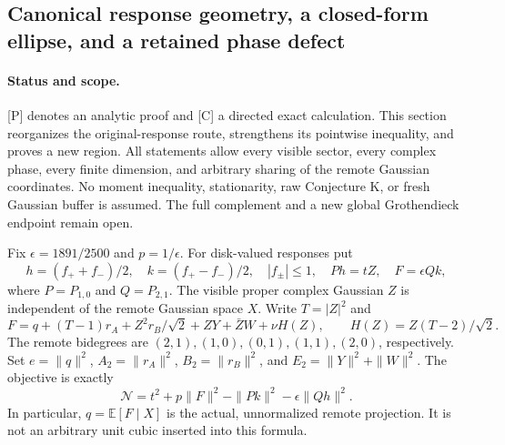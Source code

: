 \subsection{Canonical response geometry, a closed-form ellipse, and a retained phase defect}
\label{sec:canonical-response-ellipse}

\paragraph{Status and scope.}
[P] denotes an analytic proof and [C] a directed exact calculation.
This section reorganizes the original-response route, strengthens its
pointwise inequality, and proves a new region. All statements allow every
visible sector, every complex phase, every finite dimension, and arbitrary
sharing of the remote Gaussian coordinates. No moment inequality,
stationarity, raw Conjecture K, or fresh Gaussian buffer is assumed.
The full complement and a new global Grothendieck endpoint remain open.

Fix $\epsilon=1891/2500$ and $p=1/\epsilon$. For disk-valued responses put
\[
 h=(f_++f_-)/2,\quad k=(f_+-f_-)/2,\quad |f_\pm|\le1,
 \quad Ph=tZ,\quad F=\epsilon Qk,
\]
where $P=P_{1,0}$ and $Q=P_{2,1}$. The visible proper complex Gaussian
$Z$ is independent of the remote Gaussian space $X$. Write $T=|Z|^2$ and
\[
 F=q+(T-1)r_A+Z^2r_B/\sqrt2+ZY+\bar ZW+\nu H(Z),
 \qquad H(Z)=Z(T-2)/\sqrt2.
\]
The remote bidegrees are $(2,1),(1,0),(0,1),(1,1),(2,0)$, respectively.
Set $e=\|q\|^2$, $A_2=\|r_A\|^2$, $B_2=\|r_B\|^2$, and
$E_2=\|Y\|^2+\|W\|^2$. The objective is exactly
\[
 \mathcal N=t^2+p\|F\|^2-\|Pk\|^2-\epsilon\|Qh\|^2.
\]
In particular, $q=\mathbb E[F\mid X]$ is the actual, unnormalized remote
projection. It is not an arbitrary unit cubic inserted into this formula.

